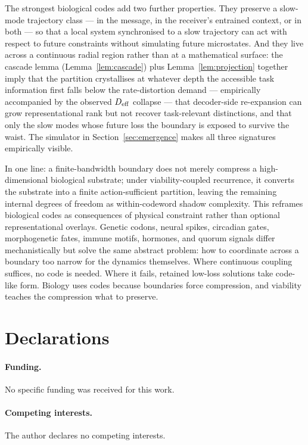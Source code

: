 \documentclass[12pt]{article}
\theoremstyle{definition}
\begin{document}
The strongest biological codes add two further properties. They preserve a slow-mode trajectory class --- in the message, in the receiver's entrained context, or in both --- so that a local system synchronised to a slow trajectory can act with respect to future constraints without simulating future microstates. And they live across a continuous radial region rather than at a mathematical surface: the cascade lemma (Lemma~\ref{lem:cascade}) plus Lemma~\ref{lem:projection} together imply that the partition crystallises at whatever depth the accessible task information first falls below the rate-distortion demand --- empirically accompanied by the observed $D_{\rm eff}$ collapse --- that decoder-side re-expansion can grow representational rank but not recover task-relevant distinctions, and that only the slow modes whose future loss the boundary is exposed to survive the waist. The simulator in Section~\ref{sec:emergence} makes all three signatures empirically visible.

In one line: a finite-bandwidth boundary does not merely compress a high-dimensional biological substrate; under viability-coupled recurrence, it converts the substrate into a finite action-sufficient partition, leaving the remaining internal degrees of freedom as within-codeword shadow complexity. This reframes biological codes as consequences of physical constraint rather than optional representational overlays. Genetic codons, neural spikes, circadian gates, morphogenetic fates, immune motifs, hormones, and quorum signals differ mechanistically but solve the same abstract problem: how to coordinate across a boundary too narrow for the dynamics themselves. Where continuous coupling suffices, no code is needed. Where it fails, retained low-loss solutions take code-like form. Biology uses codes because boundaries force compression, and viability teaches the compression what to preserve.

\section*{Declarations}

\paragraph{Funding.} No specific funding was received for this work.

\paragraph{Competing interests.} The author declares no competing interests.
\end{document}
